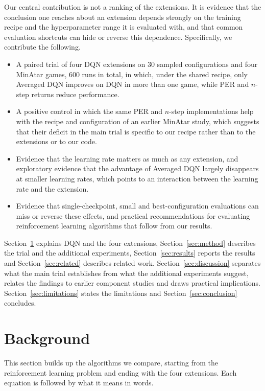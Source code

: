 \documentclass[conference,a4paper]{IEEEtran}
\begin{document}
Our central contribution is not a ranking of the extensions. It is evidence that the conclusion one reaches about an
extension depends strongly on the training recipe and the hyperparameter range it is evaluated with, and that common
evaluation shortcuts can hide or reverse this dependence. Specifically, we contribute the following.
\begin{itemize}
\item A paired trial of four DQN extensions on 30 sampled configurations and four MinAtar games, 600 runs in total,
in which, under the shared recipe, only Averaged DQN improves on DQN in more than one game, while PER and $n$-step
returns reduce performance.
\item A positive control in which the same PER and $n$-step implementations help with the recipe and configuration of
an earlier MinAtar study, which suggests that their deficit in the main trial is specific to our recipe rather than to
the extensions or to our code.
\item Evidence that the learning rate matters as much as any extension, and exploratory evidence that the advantage of
Averaged DQN largely disappears at smaller learning rates, which points to an interaction between the learning rate
and the extension.
\item Evidence that single-checkpoint, small and best-configuration evaluations can miss or reverse these effects,
and practical recommendations for evaluating reinforcement learning algorithms that follow from our results.
\end{itemize}

Section~\ref{sec:background} explains DQN and the four extensions, Section~\ref{sec:method} describes the trial and the
additional experiments, Section~\ref{sec:results} reports the results and Section~\ref{sec:related} describes related
work. Section~\ref{sec:discussion} separates what the main trial establishes from what the additional experiments
suggest, relates the findings to earlier component studies and draws practical implications.
Section~\ref{sec:limitations} states the limitations and Section~\ref{sec:conclusion} concludes.

\section{Background}\label{sec:background}

This section builds up the algorithms we compare, starting from the reinforcement learning problem and ending with
the four extensions. Each equation is followed by what it means in words.
\end{document}
